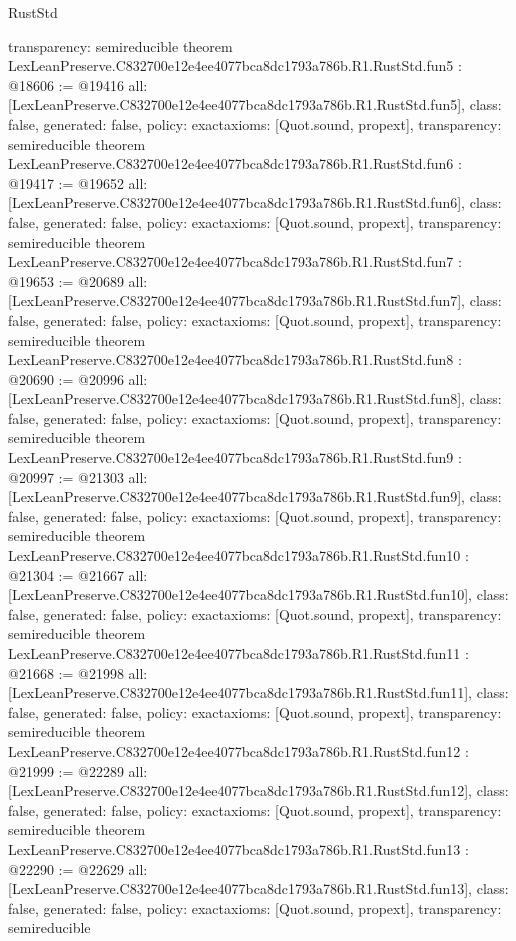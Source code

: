 \begin{lexlean}{RustStd}
\begin{coremodule}
{  transparency: semireducible
}
theorem LexLeanPreserve.C832700e12e4ee4077bca8dc1793a786b.R1.RustStd.fun5 : @18606 := @19416 {
  all: [LexLeanPreserve.C832700e12e4ee4077bca8dc1793a786b.R1.RustStd.fun5],
  class: false,
  generated: false,
  policy: exact{axioms: [Quot.sound, propext]},
  transparency: semireducible
}
theorem LexLeanPreserve.C832700e12e4ee4077bca8dc1793a786b.R1.RustStd.fun6 : @19417 := @19652 {
  all: [LexLeanPreserve.C832700e12e4ee4077bca8dc1793a786b.R1.RustStd.fun6],
  class: false,
  generated: false,
  policy: exact{axioms: [Quot.sound, propext]},
  transparency: semireducible
}
theorem LexLeanPreserve.C832700e12e4ee4077bca8dc1793a786b.R1.RustStd.fun7 : @19653 := @20689 {
  all: [LexLeanPreserve.C832700e12e4ee4077bca8dc1793a786b.R1.RustStd.fun7],
  class: false,
  generated: false,
  policy: exact{axioms: [Quot.sound, propext]},
  transparency: semireducible
}
theorem LexLeanPreserve.C832700e12e4ee4077bca8dc1793a786b.R1.RustStd.fun8 : @20690 := @20996 {
  all: [LexLeanPreserve.C832700e12e4ee4077bca8dc1793a786b.R1.RustStd.fun8],
  class: false,
  generated: false,
  policy: exact{axioms: [Quot.sound, propext]},
  transparency: semireducible
}
theorem LexLeanPreserve.C832700e12e4ee4077bca8dc1793a786b.R1.RustStd.fun9 : @20997 := @21303 {
  all: [LexLeanPreserve.C832700e12e4ee4077bca8dc1793a786b.R1.RustStd.fun9],
  class: false,
  generated: false,
  policy: exact{axioms: [Quot.sound, propext]},
  transparency: semireducible
}
theorem LexLeanPreserve.C832700e12e4ee4077bca8dc1793a786b.R1.RustStd.fun10 : @21304 := @21667 {
  all: [LexLeanPreserve.C832700e12e4ee4077bca8dc1793a786b.R1.RustStd.fun10],
  class: false,
  generated: false,
  policy: exact{axioms: [Quot.sound, propext]},
  transparency: semireducible
}
theorem LexLeanPreserve.C832700e12e4ee4077bca8dc1793a786b.R1.RustStd.fun11 : @21668 := @21998 {
  all: [LexLeanPreserve.C832700e12e4ee4077bca8dc1793a786b.R1.RustStd.fun11],
  class: false,
  generated: false,
  policy: exact{axioms: [Quot.sound, propext]},
  transparency: semireducible
}
theorem LexLeanPreserve.C832700e12e4ee4077bca8dc1793a786b.R1.RustStd.fun12 : @21999 := @22289 {
  all: [LexLeanPreserve.C832700e12e4ee4077bca8dc1793a786b.R1.RustStd.fun12],
  class: false,
  generated: false,
  policy: exact{axioms: [Quot.sound, propext]},
  transparency: semireducible
}
theorem LexLeanPreserve.C832700e12e4ee4077bca8dc1793a786b.R1.RustStd.fun13 : @22290 := @22629 {
  all: [LexLeanPreserve.C832700e12e4ee4077bca8dc1793a786b.R1.RustStd.fun13],
  class: false,
  generated: false,
  policy: exact{axioms: [Quot.sound, propext]},
  transparency: semireducible
}
\end{coremodule}
\end{lexlean}
